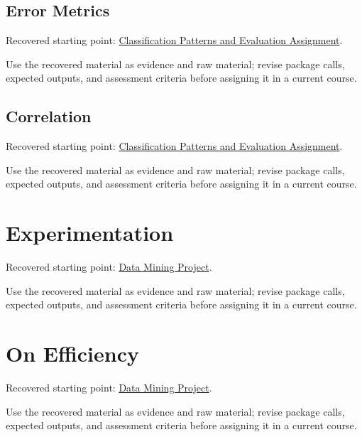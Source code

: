 \documentclass[
  letterpaper,
]{scrbook}
\begin{document}
\subsection*{Error Metrics}\label{sec-pr-14-error-metrics}

Recovered starting point:
\hyperref[sec-lab-classification-patterns-assignment]{Classification
Patterns and Evaluation Assignment}.

Use the recovered material as evidence and raw material; revise package
calls, expected outputs, and assessment criteria before assigning it in
a current course.

\subsection*{Correlation}\label{sec-pr-14-correlation}

Recovered starting point:
\hyperref[sec-lab-classification-patterns-assignment]{Classification
Patterns and Evaluation Assignment}.

Use the recovered material as evidence and raw material; revise package
calls, expected outputs, and assessment criteria before assigning it in
a current course.

\section*{Experimentation}\label{sec-pr-14-experimentation}


Recovered starting point: \hyperref[sec-lab-data-mining-project]{Data
Mining Project}.

Use the recovered material as evidence and raw material; revise package
calls, expected outputs, and assessment criteria before assigning it in
a current course.

\section*{On Efficiency}\label{sec-pr-14-on-efficiency}


Recovered starting point: \hyperref[sec-lab-data-mining-project]{Data
Mining Project}.

Use the recovered material as evidence and raw material; revise package
calls, expected outputs, and assessment criteria before assigning it in
a current course.
\end{document}
